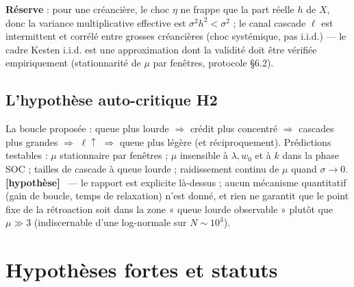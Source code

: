 \documentclass[11pt,a4paper]{article}
\newcommand{\hypothese}[1]{\textbf{[hypothèse]}~#1}
\begin{document}
\textbf{Réserve} : pour une créancière, le choc $\eta$ ne frappe que la part
réelle $h$ de $X$, donc la variance multiplicative effective est
$\sigma^2 h^2 < \sigma^2$ ; le canal cascade $\ell$ est intermittent et
corrélé entre grosses créancières (choc systémique, pas i.i.d.) — le cadre
Kesten i.i.d. est une approximation dont la validité doit être vérifiée
empiriquement (stationnarité de $\mu$ par fenêtres, protocole §6.2).

\subsection{L'hypothèse auto-critique H2}
La boucle proposée : queue plus lourde $\Rightarrow$ crédit plus concentré
$\Rightarrow$ cascades plus grandes $\Rightarrow$ $\ell \uparrow$
$\Rightarrow$ queue plus légère (et réciproquement). Prédictions testables :
$\mu$ stationnaire par fenêtres ; $\mu$ insensible à $\lambda, w_0$ et à $k$
dans la phase SOC ; tailles de cascade à queue lourde ; raidissement continu
de $\mu$ quand $\sigma \to 0$. \hypothese{} — le rapport est explicite
là-dessus ; aucun mécanisme quantitatif (gain de boucle, temps de relaxation)
n'est donné, et rien ne garantit que le point fixe de la rétroaction soit
dans la zone « queue lourde observable » plutôt que $\mu \gg 3$
(indiscernable d'une log-normale sur $N \sim 10^3$).

\section{Hypothèses fortes et statuts}
\label{sec:hypotheses}
\end{document}
